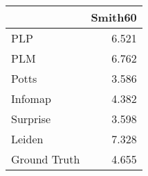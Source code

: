 \begin{tabular}{lr}
\toprule
{} & Smith60 \\
\midrule
PLP          &   6.521 \\
PLM          &   6.762 \\
Potts        &   3.586 \\
Infomap      &   4.382 \\
Surprise     &   3.598 \\
Leiden       &   7.328 \\
Ground Truth &   4.655 \\
\bottomrule
\end{tabular}
